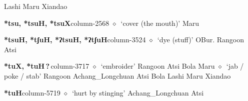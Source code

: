 \hspace{1ex}
         Lashi 
\hspace{1ex}
         Maru 
\hspace{1ex}
         Xiandao 
  \item {\footnotesize \textbf{*tsu, *tsuH, *tsuX}}{\tiny column-2568}
         $\diamond$~`cover (the mouth)'
         Maru 
  \item {\footnotesize \textbf{*tsuH, *tʃuH, *ʔtsuH, *ʔtʃuH}}{\tiny column-3524}
         $\diamond$~`dye (stuff)'
         OBur. 
\hspace{1ex}
         Rangoon 
\hspace{1ex}
         Atsi 
  \item {\footnotesize \textbf{*tuX, *tuH\,?\,}}{\tiny column-3717}
         $\diamond$~`embroider'
         Rangoon 
\hspace{1ex}
         Atsi 
\hspace{1ex}
         Bola 
\hspace{1ex}
         Maru 
\hspace{1ex}
         $\diamond$~`jab / poke / stab'
         Rangoon 
\hspace{1ex}
         Achang\_Longchuan 
\hspace{1ex}
         Atsi 
\hspace{1ex}
         Bola 
\hspace{1ex}
         Lashi 
\hspace{1ex}
         Maru 
\hspace{1ex}
         Xiandao 
  \item {\footnotesize \textbf{*tuH}}{\tiny column-5719}
         $\diamond$~`hurt by stinging'
         Achang\_Longchuan 
\hspace{1ex}
         Atsi 
\hspace{1ex}
